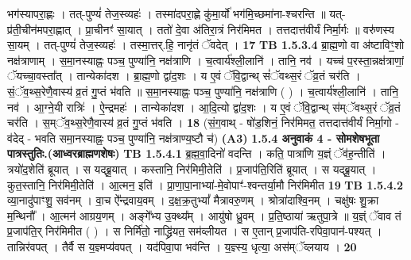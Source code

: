 \documentclass[17pt]{extarticle}
\begin{document}
                  भग॑स्यापरा॒ह्णः । तत्-पुण्यं॑ तेज॒स्व्यहः॑ । तस्मा॑दपरा॒ह्णे कु॑मा॒र्यो॑ भग॑मि॒च्छमा॑ना-श्चरन्ति ॥ यत्-प्र॑ती॒चीन॑मपरा॒ह्णात् । प्रा॒चीनꣳ॑ सा॒यात् । ततो॑ दे॒वा अ॑तिरा॒त्रं निर॑मिमत । तत्तदात्त॑वीर्यं निर्मा॒र्गः ॥ वरु॑णस्य सा॒यम् । तत्-पुण्यं॑ तेज॒स्व्यहः॑ । तस्मा॒त्तर्.हि॒ नानृ॑तं ॅवदेत् । \textbf{ 17} \newline
                  \newline
                                \textbf{ TB 1.5.3.4} \newline
                  ब्रा॒ह्म॒णो वा अ॑ष्टाविꣳ॒॒शो नक्ष॑त्राणाम् । स॒मा॒नस्याह्नः॒ पञ्च॒ पुण्या॑नि॒ नक्ष॑त्राणि । च॒त्वार्य॑श्ली॒लानि॑ । तानि॒ नव॑ । यच्च॑ प॒रस्ता॒न्नक्ष॑त्राणां॒ ॅयच्चा॒वस्ता᳚त् । तान्येका॑दश । ब्रा॒ह्म॒णो द्वा॑द॒शः । य ए॒वं ॅवि॒द्वान्थ् सं॑ॅवथ्स॒रं ॅव्र॒तं चर॑ति । सं॒ॅव॒थ्स॒रेणै॒वास्य॑ व्र॒तं गु॒प्तं भ॑वति ॥ स॒मा॒नस्याह्नः॒ पञ्च॒ पुण्या॑नि॒ नक्ष॑त्राणि ( ) । च॒त्वार्य॑श्ली॒लानि॑ । तानि॒ नव॑ । आ॒ग्ने॒यी रात्रिः॑ । ऐ॒न्द्रमहः॑ । तान्येका॑दश । आ॒दि॒त्यो द्वा॑द॒शः । य ए॒वं ॅवि॒द्वान्थ् स॑म्ॅवथ्स॒रं ॅव्र॒तं चर॑ति । स॒म्ॅव॒थ्स॒रेणै॒वास्य॑ व्र॒तं गु॒प्तं भ॑वति । \textbf{ 18} \newline
                  \newline
                                    (सं॒ग॒वाथ् - षो॑ड॒शिनं॒ निर॑मिमत॒ तत्तदात्त॑वीर्यं निर्मा॒गो - व॑देद् - भवति समा॒नस्याह्नः॒ पञ्च॒ पुण्या॑नि॒ नक्ष॑त्राण्य॒ष्टौ च॑) \textbf{(A3)} \newline \newline
                \textbf{ 1.5.4      अनुवाकं   4 - सोमशेषभूता पात्रस्तुतिः.(आध्वरब्राह्मणशेषः)} \newline
                                \textbf{ TB 1.5.4.1} \newline
                  ब्र॒ह्म॒वा॒दिनो॑ वदन्ति । कति॒ पात्रा॑णि य॒ज्ञ्ं ॅव॑ह॒न्तीति॑ । त्रयो॑द॒शेति॑ ब्रूयात् । स यद्ब्रू॒यात् । कस्तानि॒ निर॑मिमी॒तेति॑ । प्र॒जाप॑ति॒रिति॑ ब्रूयात् । स यद्ब्रू॒यात् । कुत॒स्तानि॒ निर॑मिमी॒तेति॑ । आ॒त्मन॒ इति॑ । प्रा॒णा॒पा॒नाभ्या॑-मे॒वोपाꣳ॑-श्वन्तर्या॒मौ निर॑मिमीत \textbf{ 19} \newline
                  \newline
                                \textbf{ TB 1.5.4.2} \newline
                  व्या॒नादु॑पाꣳशु॒ सव॑नम् । वा॒च ऐ᳚न्द्रवाय॒वम् । द॒क्ष॒क्र॒तुभ्यां᳚ मैत्रावरु॒णम् । श्रोत्रा॑दाश्वि॒नम् । चक्षु॑षः शु॒क्रा म॒न्थिनौ᳚ । आ॒त्मन॑ आग्रय॒णम् । अङ्गे᳚भ्य उ॒क्थ्य᳚म् । आयु॑षो ध्रु॒वम् । प्र॒ति॒ष्ठाया॑ ऋतुपा॒त्रे ॥ य॒ज्ञ्ं ॅवाव तं प्र॒जाप॑ति॒र् निर॑मिमीत ( ) । स निर्मि॑तो॒ नाद्ध्रि॑यत॒ सम॑व्लीयत । स ए॒तान् प्र॒जाप॑ति-रपिवा॒पान॑-पश्यत् । तान्निर॑वपत् । तैर्वै स य॒ज्ञ्मप्य॑वपत् । यद॑पिवा॒पा भव॑न्ति । य॒ज्ञ्स्य॒ धृत्या॒ अस॑म्ॅव्लयाय । \textbf{ 20} \newline
\end{document}
